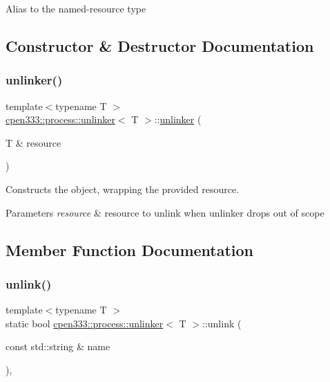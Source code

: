 Alias to the named-\/resource type 

\subsection{Constructor \& Destructor Documentation}
\mbox{\label{classcpen333_1_1process_1_1unlinker_a44039679bd9939254fc53a5e876d8b8c}} 
\subsubsection{\texorpdfstring{unlinker()}{unlinker()}}
{\footnotesize\ttfamily template$<$typename T $>$ \\
\hyperlink{classcpen333_1_1process_1_1unlinker}{cpen333\+::process\+::unlinker}$<$ T $>$\+::\hyperlink{classcpen333_1_1process_1_1unlinker}{unlinker} (\begin{DoxyParamCaption}\item[{T \&}]{resource }\end{DoxyParamCaption})\hspace{0.3cm}{\ttfamily [inline]}}



Constructs the object, wrapping the provided resource. 


\begin{DoxyParams}{Parameters}
{\em resource} & resource to unlink when unlinker drops out of scope \\
\hline
\end{DoxyParams}


\subsection{Member Function Documentation}
\mbox{\label{classcpen333_1_1process_1_1unlinker_a00dd4ad138a95aa0173f81fd83c3210e}} 
\subsubsection{\texorpdfstring{unlink()}{unlink()}}
{\footnotesize\ttfamily template$<$typename T $>$ \\
static bool \hyperlink{classcpen333_1_1process_1_1unlinker}{cpen333\+::process\+::unlinker}$<$ T $>$\+::unlink (\begin{DoxyParamCaption}\item[{const std\+::string \&}]{name }\end{DoxyParamCaption})\hspace{0.3cm}{\ttfamily [inline]}, {\ttfamily [static]}}




